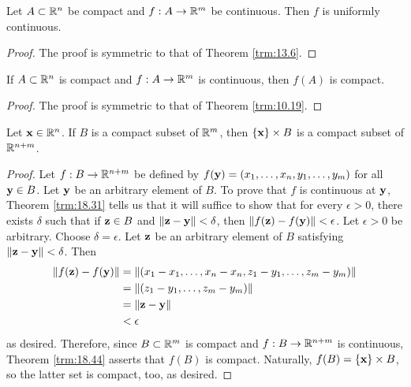 \documentclass[../main.tex]{subfiles}
\begin{document}
\begin{theorem}\label{trm:18.43}
    Let $A\subset\mathbb{R}^n$ be compact and $f:A\to\mathbb{R}^m$ be continuous. Then $f$ is uniformly continuous.
    \begin{proof}
        The proof is symmetric to that of Theorem \ref{trm:13.6}.
    \end{proof}
\end{theorem}

\begin{theorem}\label{trm:18.44}
    If $A\subset\mathbb{R}^n$ is compact and $f:A\to\mathbb{R}^m$ is continuous, then $f(A)$ is compact.
    \begin{proof}
        The proof is symmetric to that of Theorem \ref{trm:10.19}.
    \end{proof}
\end{theorem}

\begin{corollary}\label{cly:18.45}
    Let $\mathbf{x}\in\mathbb{R}^n$. If $B$ is a compact subset of $\mathbb{R}^m$, then $\{\mathbf{x}\}\times B$ is a compact subset of $\mathbb{R}^{n+m}$.
    \begin{proof}
        Let $f:B\to\mathbb{R}^{n+m}$ be defined by $f(\mathbf{y})=(x_1,\dots,x_n,y_1,\dots,y_m)$ for all $\mathbf{y}\in B$. Let $\mathbf{y}$ be an arbitrary element of $B$. To prove that $f$ is continuous at $\mathbf{y}$, Theorem \ref{trm:18.31} tells us that it will suffice to show that for every $\epsilon>0$, there exists $\delta$ such that if $\mathbf{z}\in B$ and $\norm{\mathbf{z}-\mathbf{y}}<\delta$, then $\norm{f(\mathbf{z})-f(\mathbf{y})}<\epsilon$. Let $\epsilon>0$ be arbitrary. Choose $\delta=\epsilon$. Let $\mathbf{z}$ be an arbitrary element of $B$ satisfying $\norm{\mathbf{z}-\mathbf{y}}<\delta$. Then
        \begin{align*}
            \norm{f(\mathbf{z})-f(\mathbf{y})} &= \norm{(x_1-x_1,\dots,x_n-x_n,z_1-y_1,\dots,z_m-y_m)}\\
            &= \norm{(z_1-y_1,\dots,z_m-y_m)}\\
            &= \norm{\mathbf{z}-\mathbf{y}}\\
            &< \epsilon
        \end{align*}
        as desired. Therefore, since $B\subset\mathbb{R}^m$ is compact and $f:B\to\mathbb{R}^{n+m}$ is continuous, Theorem \ref{trm:18.44} asserts that $f(B)$ is compact. Naturally, $f(B)=\{\mathbf{x}\}\times B$, so the latter set is compact, too, as desired.
    \end{proof}
\end{corollary}
\end{document}
